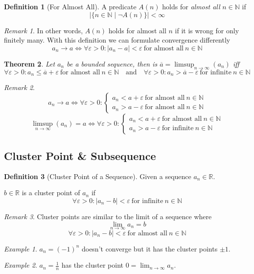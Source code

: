 \documentclass[english,titlepage]{uzhpub}
\theoremstyle{definition}
\newtheorem{definition}{Definition}[section]
\theoremstyle{plain}
\newtheorem{theorem}[definition]{Theorem} %
\theoremstyle{remark}
\newtheorem*{remark}{Remark}
\theoremstyle{example}
\newtheorem*{example}{Example}
\begin{document}
   \begin{definition}[For Almost All]
      A predicate \(A(n)\) holds for \textit{almost all} \(n \in \mathbb{N}\) if
      \[\big|\{n \in \mathbb{N} \mid \neg A(n)\}\big| < \infty\]
   \end{definition}
   \begin{remark}
      In other words, \(A(n)\) holds for almost all \(n\) if it is wrong for only finitely many.
      With this definition we can formulate convergence differently
      \[a_n \to a \iff \forall \varepsilon > 0: |a_n - a| < \varepsilon~\text{for almost all}~n \in \mathbb{N}\]
   \end{remark}

   \begin{theorem}\label{thm:bounded_seq}
      Let \(a_n\) be a bounded sequence, then is \(\overline{a} = \limsup_{n \to \infty}(a_n)\) iff
      \[\forall \varepsilon > 0: a_n \leq \overline{a} + \varepsilon~\text{for almost all}~n \in \mathbb{N} \quad\text{and}\quad \forall \varepsilon > 0: a_n > \overline{a} - \varepsilon~\text{for infinite}~n \in \mathbb{N}\]
   \end{theorem}
   \begin{remark}
      \[a_n \to a \iff \forall \varepsilon > 0: \begin{cases} a_n < a + \varepsilon~\text{for almost all}~n \in \mathbb{N}\\ a_n > a - \varepsilon~\text{for almost all}~n \in \mathbb{N} \end{cases}\]
      \[\limsup_{n \to \infty}(a_n) = a \iff \forall \varepsilon > 0: \begin{cases} a_n < a + \varepsilon~\text{for almost all}~n \in \mathbb{N}\\ a_n > a - \varepsilon~\text{for infinite}~n \in \mathbb{N} \end{cases}\]
   \end{remark}

   \subsection{Cluster Point \& Subsequence}
   \begin{definition}[Cluster Point of a Sequence]
      Given a sequence \(a_n \in \mathbb{R}\).

      \(b \in \mathbb{R}\) is a cluster point of \(a_n\) if
      \[\forall \varepsilon > 0: |a_n - b| < \varepsilon~\text{for infinite}~n \in \mathbb{N}\]
   \end{definition}
   \begin{remark}
      Cluster points are similar to the limit of a sequence where
      \[\lim_{n \to \infty} a_n = b\]
      \[\forall \varepsilon > 0: |a_n - b| < \varepsilon~\text{for almost all}~n \in \mathbb{N}\]
   \end{remark}
   \begin{example}
      \(a_n = (-1)^n\) doesn't converge but it has the cluster points \(\pm 1\).
   \end{example}
   \begin{example}
      \(a_n = \frac{1}{n}\) has the cluster point \(0 = \lim_{n \to \infty} a_n\).
   \end{example}
\end{document}
